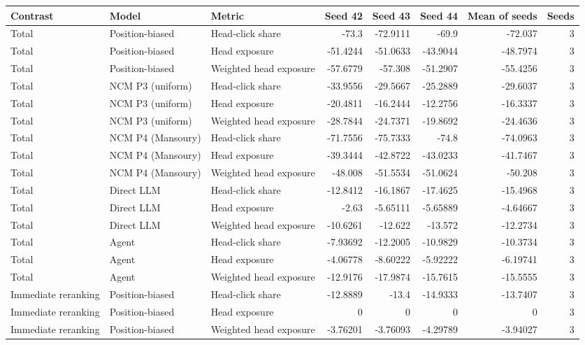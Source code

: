 \begin{table}[htbp!]
\centering
\small
\setlength{\tabcolsep}{3pt}
\renewcommand{\arraystretch}{1.1}
\begin{tabular}{lllrrrrr}
\hline
Contrast & Model & Metric & Seed 42 & Seed 43 & Seed 44 & Mean of seeds & Seeds \\
\hline
Total & Position-biased & Head-click share & -73.3 & -72.9111 & -69.9 & -72.037 & 3 \\
Total & Position-biased & Head exposure & -51.4244 & -51.0633 & -43.9044 & -48.7974 & 3 \\
Total & Position-biased & Weighted head exposure & -57.6779 & -57.308 & -51.2907 & -55.4256 & 3 \\
Total & NCM P3 (uniform) & Head-click share & -33.9556 & -29.5667 & -25.2889 & -29.6037 & 3 \\
Total & NCM P3 (uniform) & Head exposure & -20.4811 & -16.2444 & -12.2756 & -16.3337 & 3 \\
Total & NCM P3 (uniform) & Weighted head exposure & -28.7844 & -24.7371 & -19.8692 & -24.4636 & 3 \\
Total & NCM P4 (Mansoury) & Head-click share & -71.7556 & -75.7333 & -74.8 & -74.0963 & 3 \\
Total & NCM P4 (Mansoury) & Head exposure & -39.3444 & -42.8722 & -43.0233 & -41.7467 & 3 \\
Total & NCM P4 (Mansoury) & Weighted head exposure & -48.008 & -51.5534 & -51.0624 & -50.208 & 3 \\
Total & Direct LLM & Head-click share & -12.8412 & -16.1867 & -17.4625 & -15.4968 & 3 \\
Total & Direct LLM & Head exposure & -2.63 & -5.65111 & -5.65889 & -4.64667 & 3 \\
Total & Direct LLM & Weighted head exposure & -10.6261 & -12.622 & -13.572 & -12.2734 & 3 \\
Total & Agent & Head-click share & -7.93692 & -12.2005 & -10.9829 & -10.3734 & 3 \\
Total & Agent & Head exposure & -4.06778 & -8.60222 & -5.92222 & -6.19741 & 3 \\
Total & Agent & Weighted head exposure & -12.9176 & -17.9874 & -15.7615 & -15.5555 & 3 \\
Immediate reranking & Position-biased & Head-click share & -12.8889 & -13.4 & -14.9333 & -13.7407 & 3 \\
Immediate reranking & Position-biased & Head exposure & 0 & 0 & 0 & 0 & 3 \\
Immediate reranking & Position-biased & Weighted head exposure & -3.76201 & -3.76093 & -4.29789 & -3.94027 & 3 \\

\end{tabular}
\end{table}
